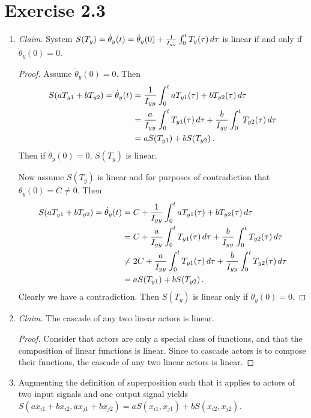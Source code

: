 \documentclass{abrice}
\begin{document}
\section{Exercise 2.3}

\begin{enumerate}[label= (\alph*)]
\item \textit{Claim.}
  System $S(T_y) = \dot{\theta}_y(t) = \dot{\theta}_y(0) + {1 \over I_{yy}} \int_0^t
  T_y(\tau)\, d\tau$ is linear if and only if $\dot{\theta}_y(0) = 0$.

  \begin{proof}
    Assume $\dot{\theta}_y(0) = 0$. Then
    \begin{align*}
      S(aT_{y1} + bT_{y2}) = \dot{\theta}_y(t)
      &= {1 \over I_{yy}} \int_0^t a T_{y1}(\tau) + b T_{y2}(\tau)\, d\tau \\
      &= {a \over I_{yy}} \int_0^t T_{y1}(\tau)\, d\tau + {b \over I_{yy}}
        \int_0^t T_{y2}(\tau)\, d\tau \\
      &= a S(T_{y1}) + b S(T_{y2})\, .
    \end{align*}
    Then if $\dot{\theta}_y(0) = 0$, $S(T_y)$ is linear.

    Now assume $S(T_y)$ is linear and for purposes of contradiction that
    $\dot{\theta}_y(0) = C \neq 0$. Then
    \begin{align*}
      S(aT_{y1} + bT_{y2}) = \dot{\theta}_y(t)
      &= C + {1 \over I_{yy}} \int_0^t a T_{y1}(\tau) + b T_{y2}(\tau)\, d\tau
      \\
      &= C + {a \over I_{yy}} \int_0^t T_{y1}(\tau)\, d\tau + {b \over I_{yy}}
        \int_0^t T_{y2}(\tau)\, d\tau \\
      &\neq 2C + {a \over I_{yy}} \int_0^t T_{y1}(\tau)\, d\tau + {b \over I_{yy}}
        \int_0^t T_{y2}(\tau)\, d\tau \\
      &= a S(T_{y1}) + b S(T_{y2})\, .
    \end{align*}
    Clearly we have a contradiction. Then $S(T_y)$ is linear only if
    $\dot{\theta}_y(0) = 0$.
  \end{proof}
\item \textit{Claim.} The cascade of any two linear actors is linear.
  \begin{proof}
    Consider that actors are only a special class of functions, and that the
    composition of linear functions is linear. Since to cascade actors is to
    compose their functions, the cascade of any two linear actors is linear.
  \end{proof}
\item Augmenting the definition of superposition such that it applies to actors
  of two input signals and one output signal yields
  $S(ax_{i1} + bx_{i2}, ax_{j1} + bx_{j2}) = aS(x_{i1},x_{j1}) +
  bS(x_{i2},x_{j2})$.


\end{enumerate}
\end{document}

